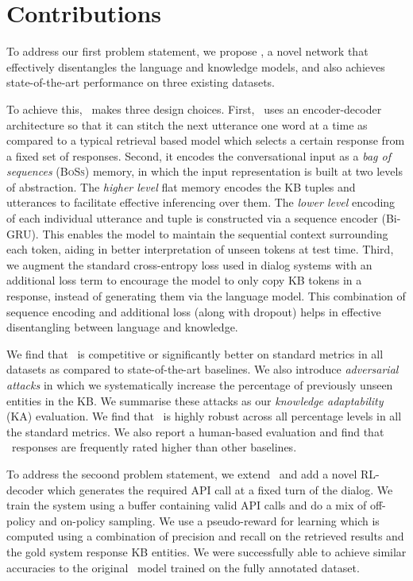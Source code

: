 \section{Contributions}

To address our first problem statement, we propose \sys, a novel network that effectively disentangles the language and knowledge models, and also achieves state-of-the-art performance on three existing datasets. 

To achieve this, \sys\ makes three design choices. 
First, \sys\ uses an encoder-decoder architecture so that it can stitch the next utterance one word at a time as compared to a typical retrieval based model which selects a certain response from a fixed set of responses. 
Second, it encodes the conversational input as a {\em bag of sequences} (\textsc{BoSs}) memory, in which the input representation is built at two levels of abstraction. The \emph{higher level} flat memory encodes the KB tuples and utterances to facilitate effective inferencing over them. The \emph{lower level} encoding of each individual utterance and tuple is constructed via a sequence encoder (Bi-GRU). This enables the model to maintain the sequential context surrounding each token, aiding in better interpretation of unseen tokens at test time. 
Third, we augment the standard cross-entropy loss used in dialog systems with an additional loss term to encourage the model to only copy KB tokens in a response, instead of generating them via the language model. This combination of sequence encoding and additional loss (along with dropout) helps in effective disentangling between language and knowledge. 

We find that \sys\ is competitive or significantly better on standard metrics in all datasets as compared to state-of-the-art baselines. We also introduce {\em adversarial attacks} in which we systematically increase the percentage of previously unseen entities in the KB. We summarise these attacks as our {\em knowledge adaptability} (KA) evaluation. We find that \sys\ is highly robust across all percentage levels in all the standard metrics. We also report a human-based evaluation and find that \sys\ responses are frequently rated higher than other baselines.

To address the secoond problem statement, we extend \sys\ and add a novel RL-decoder which generates the required API call at a fixed turn of the dialog. We train the system using a buffer containing valid API calls and do a mix of off-policy and on-policy sampling. We use a pseudo-reward for learning which is computed using a combination of precision and recall on the retrieved results and the gold system response KB entities. We were successfully able to achieve similar accuracies to the original \sys\ model trained on the fully annotated dataset.

